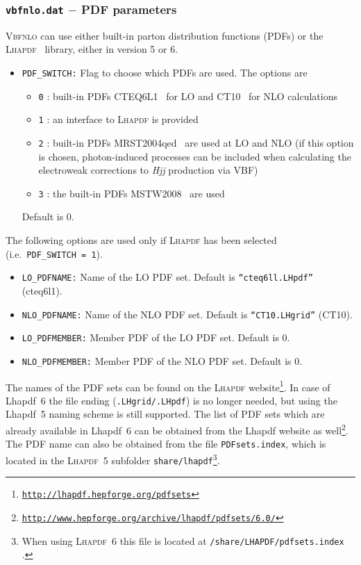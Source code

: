 \documentclass[english,12pt]{article}
\begin{document}
\subsubsection{{\tt vbfnlo.dat} $-$ PDF  parameters}
\label{sec:pdf}
\textsc{Vbfnlo} can use either built-in parton distribution functions (PDFs)
or the \textsc{Lhapdf}~\cite{Whalley:2005nh} library, either in version 5 or 6.  
\begin{itemize}
\item {\tt PDF\_SWITCH:} Flag to choose which PDFs are used. The options are
  \begin{itemize}
    \item {\tt 0} : built-in PDFs CTEQ6L1~\cite{Pumplin:2002vw} for LO and
CT10~\cite{Lai:2010vv} for NLO calculations
    \item {\tt 1} : an interface to \textsc{Lhapdf} is provided
    \item {\tt 2} : built-in PDFs MRST2004qed~\cite{Martin:2004dh} are used at LO and NLO (if this
option is chosen, photon-induced processes can be included when calculating the
electroweak corrections to \textit{Hjj} production via VBF)
    \item {\tt 3} : the built-in PDFs MSTW2008~\cite{Martin:2009iq} are used
   \end{itemize}
 Default is 0.
\end{itemize}

The following options are used only if \textsc{Lhapdf} has been selected (i.e.\ {\tt PDF\_SWITCH~=~1}).
\begin{itemize}
\item {\tt LO\_PDFNAME:} Name of the LO PDF set. Default is {\tt ``cteq6ll.LHpdf''} (cteq6l1). 
\item {\tt NLO\_PDFNAME:} Name of the NLO PDF set. Default is {\tt ``CT10.LHgrid''} (CT10). 
\item {\tt LO\_PDFMEMBER:} Member PDF of the LO PDF set. Default is 0.
\item {\tt NLO\_PDFMEMBER:} Member PDF of the NLO PDF set. Default is 0.
\end{itemize}
The names of the PDF sets can be found on the \textsc{Lhapdf} 
website\footnote{\label{footnote:pdfsets}\href{http://lhapdf.hepforge.org/pdfsets}{\tt http://lhapdf.hepforge.org/pdfsets}}.
In case of {\sc Lhapdf}~6 the file ending ({\tt .LHgrid/.LHpdf}) is no longer needed, but using the {\sc Lhapdf}~5 naming
scheme is still supported.
The list of PDF sets which are already available in {\sc Lhapdf}~6 can be obtained from the {\sc Lhapdf} website as
well\footnote{\href{http://www.hepforge.org/archive/lhapdf/pdfsets/6.0/}{\tt http://www.hepforge.org/archive/lhapdf/pdfsets/6.0/}}.
The PDF name can also be obtained from the file {\tt PDFsets.index}, which is located in the \textsc{Lhapdf}~5 subfolder 
{\tt share/lhapdf}\footnote{\label{footnote:pdfsetsindex}When using \textsc{Lhapdf}~6 this file is located at
{\tt <LHAPDF-PATH>/share/LHAPDF/pdfsets.index} .}.
\end{document}
